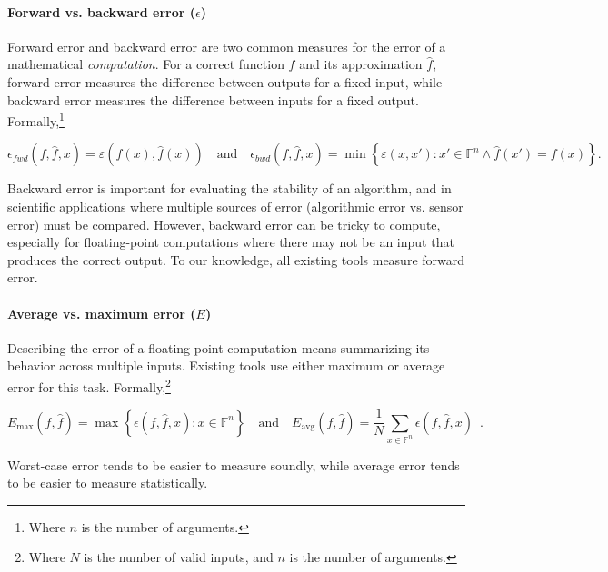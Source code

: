 \documentclass[main.tex]{subfiles}
\begin{document}
\paragraph{Forward vs. backward error ($\epsilon$)}

Forward error and backward error are two common measures
  for the error of a mathematical \emph{computation}.
For a correct function $f$ and its approximation $\hat f$,
  forward error measures the difference between outputs for a fixed input,
  while backward error measures the difference between inputs
  for a fixed output.
Formally,\footnote{Where $n$ is the number of arguments.}

\begin{equation*}
  \epsilon_{fwd}(f, \hat{f}, x) = \varepsilon(f(x), \hat{f}(x))
  \quad \text{and} \quad
  \epsilon_{bwd}(f, \hat{f}, x) =
  \min \left\{ \varepsilon(x, x') : x' \in \mathbb{F}^n \land {\hat f}(x') = f(x) \right\}.
\end{equation*}

Backward error is important for evaluating the stability of an algorithm,
  and in scientific applications where multiple sources of error
  (algorithmic error vs. sensor error) must be compared.
However, backward error can be tricky to compute,
  especially for floating-point computations
  where there may not be an input that produces the correct output.
To our knowledge, all existing tools measure forward error.

\paragraph{Average vs. maximum error ($E$)}

Describing the error of a floating-point computation
  means summarizing its behavior across multiple inputs.
Existing tools use either maximum or average error for this task.
Formally,\footnote{Where $N$ is the number of valid inputs, and $n$ is the number of arguments.}

\begin{equation*}
  E_{\text{max}}(f, \hat{f}) = \max \left\{\epsilon(f, \hat{f}, x) : x \in \mathbb{F}^n\right\}
  \quad \text{and} \quad
  E_{\text{avg}}(f, \hat{f}) = \frac{1}{N} \sum_{x\in \mathbb{F}^n} \epsilon(f, \hat{f}, x) \enspace .
\end{equation*}

Worst-case error tends to be easier to measure soundly,
  while average error tends to be easier to measure statistically.
\end{document}
